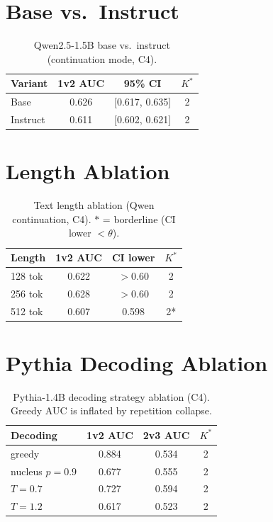 \documentclass[11pt]{article}
\begin{document}
\section{Base vs.\ Instruct}

\begin{table}[h]
\centering
\caption{Qwen2.5-1.5B base vs.\ instruct (continuation mode, C4).}
\label{tab:base_instruct}
\small
\begin{tabular}{lccc}
\toprule
Variant & 1v2 AUC & 95\% CI & $K^*$ \\
\midrule
Base & 0.626 & [0.617, 0.635] & 2 \\
Instruct & 0.611 & [0.602, 0.621] & 2 \\
\bottomrule
\end{tabular}
\end{table}

\section{Length Ablation}

\begin{table}[h]
\centering
\caption{Text length ablation (Qwen continuation, C4). $*$ = borderline (CI lower $< \theta$).}
\label{tab:length}
\small
\begin{tabular}{lccc}
\toprule
Length & 1v2 AUC & CI lower & $K^*$ \\
\midrule
128 tok & 0.622 & $>$0.60 & 2 \\
256 tok & 0.628 & $>$0.60 & 2 \\
512 tok & 0.607 & 0.598 & 2* \\
\bottomrule
\end{tabular}
\end{table}

\section{Pythia Decoding Ablation}

\begin{table}[h]
\centering
\caption{Pythia-1.4B decoding strategy ablation (C4). Greedy AUC is inflated by repetition collapse.}
\label{tab:pythia_decoding}
\small
\begin{tabular}{lccc}
\toprule
Decoding & 1v2 AUC & 2v3 AUC & $K^*$ \\
\midrule
greedy & 0.884 & 0.534 & 2 \\
nucleus $p{=}0.9$ & 0.677 & 0.555 & 2 \\
$T{=}0.7$ & 0.727 & 0.594 & 2 \\
$T{=}1.2$ & 0.617 & 0.523 & 2 \\
\bottomrule
\end{tabular}
\end{table}
\end{document}
